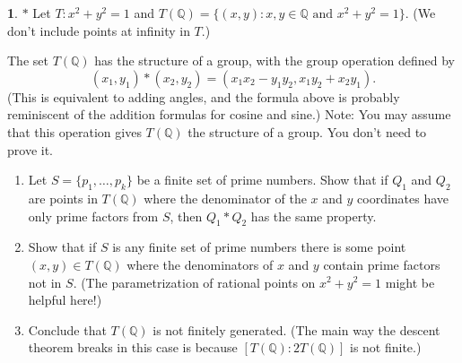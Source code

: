 \documentclass[12pt]{article}
\theoremstyle{definition}
\newtheorem{ex}{}
\begin{document}
\begin{ex}
	$*$ Let $T : x^{2} + y^{2} = 1$ and
	$T(\mathbb{Q}) = \{ (x,y) : x, y \in \mathbb{Q} \text{ and } x^{2} + y^{2} = 1
		\}$. (We don't include points at infinity in $T$.)

	The set $T(\mathbb{Q})$ has the structure of a group, with the group
	operation defined by
	\[
		(x_{1},y_{1}) * (x_{2},y_{2}) = (x_{1} x_{2} - y_{1} y_{2}, x_{1} y_{2} + x_{2} y_{1}).
	\]
	(This is equivalent to adding angles, and the formula above is probably
	reminiscent of the addition formulas for cosine and sine.) Note: You may assume that this operation gives $T(\mathbb{Q})$ the structure of a group. You don't need to prove it.

	\begin{enumerate}[label=(\alph*)]
		\item Let $S = \{ p_{1}, \ldots, p_{k} \}$ be a finite set of prime numbers.
		      Show that if $Q_{1}$ and $Q_{2}$ are points in $T(\mathbb{Q})$ where the denominator
		      of the $x$ and $y$ coordinates have only prime factors from $S$,
		      then $Q_{1} * Q_{2}$ has the same property.
		\item Show that if $S$ is any finite set of prime numbers there is
		      some point $(x,y) \in T(\mathbb{Q})$ where the denominators of $x$ and $y$ contain
		      prime factors not in $S$. (The parametrization of rational points on $x^{2} + y^{2} = 1$ might be helpful here!)
		\item Conclude that $T(\mathbb{Q})$ is not finitely generated. (The main way
		      the descent theorem breaks in this case is because $[T(\mathbb{Q}) : 2T(\mathbb{Q})]$ is
		      not finite.)
	\end{enumerate}
\end{ex}
\end{document}
